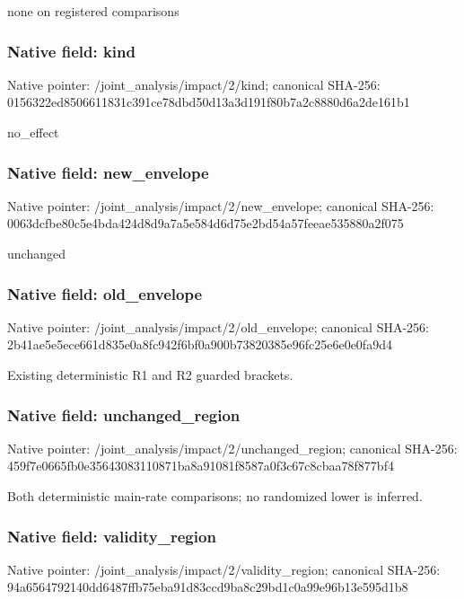 \documentclass[10pt,a4paper]{article}
\begin{document}
\begingroup\raggedright\sloppy none on registered comparisons\par\endgroup

\subsubsection{Native field: kind}
Native pointer: /joint\_\allowbreak{}analysis/impact/2/kind; canonical SHA-256: 0156322ed8506611831c391ce78dbd50d13a3d191f80b7a2c8880d6a2de161b1

\begingroup\raggedright\sloppy no\_\allowbreak{}effect\par\endgroup

\subsubsection{Native field: new\_\allowbreak{}envelope}
Native pointer: /joint\_\allowbreak{}analysis/impact/2/new\_\allowbreak{}envelope; canonical SHA-256: 0063dcfbe80c5e4bda424d8d9a7a5e584d6d75e2bd54a57feeae535880a2f075

\begingroup\raggedright\sloppy unchanged\par\endgroup

\subsubsection{Native field: old\_\allowbreak{}envelope}
Native pointer: /joint\_\allowbreak{}analysis/impact/2/old\_\allowbreak{}envelope; canonical SHA-256: 2b41ae5e5ece661d835e0a8fc942f6bf0a900b73820385e96fc25e6e0e0fa9d4

\begingroup\raggedright\sloppy Existing deterministic R1 and R2 guarded brackets.\par\endgroup

\subsubsection{Native field: unchanged\_\allowbreak{}region}
Native pointer: /joint\_\allowbreak{}analysis/impact/2/unchanged\_\allowbreak{}region; canonical SHA-256: 459f7e0665fb0e35643083110871ba8a91081f8587a0f3c67c8cbaa78f877bf4

\begingroup\raggedright\sloppy Both deterministic main-rate comparisons;\allowbreak{} no randomized lower is inferred.\par\endgroup

\subsubsection{Native field: validity\_\allowbreak{}region}
Native pointer: /joint\_\allowbreak{}analysis/impact/2/validity\_\allowbreak{}region; canonical SHA-256: 94a6564792140dd6487ffb75eba91d83ccd9ba8c29bd1c0a99e96b13e595d1b8
\end{document}
